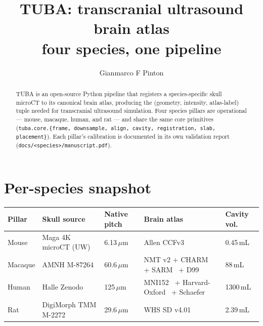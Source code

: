 \documentclass{compactarticle}
\begin{document}


\title{TUBA: transcranial ultrasound brain atlas \\
       \large four species, one pipeline}

\author{Gianmarco F Pinton}



\begin{abstract}
TUBA is an open-source Python pipeline that registers a species-specific
skull microCT to its canonical brain atlas, producing the (geometry,
intensity, atlas-label) tuple needed for transcranial ultrasound simulation. Four species pillars are operational --- mouse,
macaque, human, and rat --- and share the same core primitives
(\texttt{tuba.core.\{frame, downsample, align, cavity, registration,
slab, placement\}}). Each pillar's calibration is documented in its
own validation report (\texttt{docs/<species>/manuscript.pdf}).
\end{abstract}

\section{Per-species snapshot}

\begin{table}[H]
\centering\small
\begin{tabular}{lllll}
\toprule
\textbf{Pillar} & \textbf{Skull source} & \textbf{Native pitch} & \textbf{Brain atlas} & \textbf{Cavity vol.} \\
\midrule
Mouse   & Maga 4K microCT (UW)~\cite{maga-uw}            & 6.13\,$\mu$m  & Allen CCFv3~\cite{allen-ccfv3}                          & 0.45\,mL \\
Macaque & AMNH M-87264~\cite{copes2016}                   & 60.6\,$\mu$m  & NMT v2 + CHARM~\cite{nmt-v2} + SARM~\cite{sarm} + D99~\cite{d99}   & 88\,mL   \\
Human   & Halle Zenodo~\cite{kirchner2022}                & 125\,$\mu$m   & MNI152~\cite{fonov2011} + Harvard-Oxford~\cite{harvardoxford} + Schaefer~\cite{schaefer2018} & 1300\,mL \\
Rat     & DigiMorph TMM M-2272~\cite{digimorph-rat}       & 29.6\,$\mu$m  & WHS SD v4.01~\cite{whs-papp-2014, whs-v4}              & 2.39\,mL \\
\bottomrule
\end{tabular}
\end{table}
\end{document}
